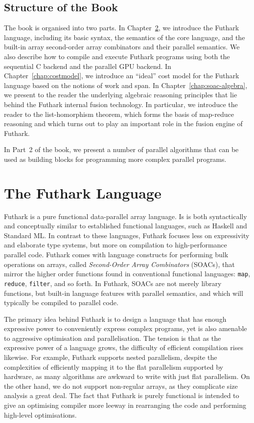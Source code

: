 \documentclass[oneside,11pt]{book}
\begin{document}
\section{Structure of the Book}

The book is organised into two parts. In Chapter~\ref{chap:futlang}, we
introduce the Futhark language, including its basic syntax, the
semantics of the core language, and the built-in array second-order
array combinators and their parallel semantics. We also describe how
to compile and execute Futhark programs using both the sequential C
backend and the parallel GPU backend. In Chapter~\ref{chap:costmodel}, we introduce
an ``ideal'' cost model for the Futhark language based on the notions
of work and span. In Chapter~\ref{chap:soac-algebra}, we present to
the reader the underlying algebraic reasoning principles that lie
behind the Futhark internal fusion technology. In particular, we
introduce the reader to the list-homorphism theorem, which forms the
basis of map-reduce reasoning and which turns out to play an important
role in the fusion engine of Futhark.

In Part~2 of the book, we present a number of parallel algorithms that
can be used as building blocks for programming more complex parallel
programs.

\chapter{The Futhark Language}
\label{chap:futlang}
Futhark is a pure functional data-parallel array language.  Is is both
syntactically and conceptually similar to established functional
languages, such as Haskell and Standard ML.  In contrast to these
languages, Futhark focuses less on expressivity and elaborate type
systems, but more on compilation to high-performance parallel code.
Futhark comes with language constructs for performing bulk operations
on arrays, called \textit{Second-Order Array Combinators} (SOACs),
that mirror the higher order functions found in conventional
functional languages: \texttt{map}, \texttt{reduce}, \texttt{filter},
and so forth.  In Futhark, SOACs are not merely library functions, but
built-in language features with parallel semantics, and which will
typically be compiled to parallel code.

The primary idea behind Futhark is to design a language that has
enough expressive power to conveniently express complex programs, yet
is also amenable to aggressive optimisation and parallelisation.  The
tension is that as the expressive power of a language grows, the
difficulty of efficient compilation rises likewise.  For example,
Futhark supports nested parallelism, despite the complexities of
efficiently mapping it to the flat parallelism supported by hardware,
as many algorithms are awkward to write with just flat parallelism.
On the other hand, we do not support non-regular arrays, as they
complicate size analysis a great deal.  The fact that Futhark is
purely functional is intended to give an optimising compiler more
leeway in rearranging the code and performing high-level
optimisations.
\end{document}
